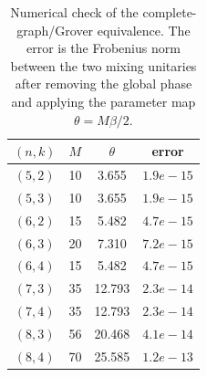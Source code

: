 \begin{table}[t]
\centering
\caption{Numerical check of the complete-graph/Grover equivalence. The error is the Frobenius norm between the two mixing unitaries after removing the global phase and applying the parameter map $\theta=M\beta/2$.}
\label{tab:grover-equivalence}
\begin{tabular}{cccc}
\toprule
$(n,k)$ & $M$ & $\theta$ & error\\
\midrule
$(5,2)$ & 10 & 3.655 & $1.9e-15$\\
$(5,3)$ & 10 & 3.655 & $1.9e-15$\\
$(6,2)$ & 15 & 5.482 & $4.7e-15$\\
$(6,3)$ & 20 & 7.310 & $7.2e-15$\\
$(6,4)$ & 15 & 5.482 & $4.7e-15$\\
$(7,3)$ & 35 & 12.793 & $2.3e-14$\\
$(7,4)$ & 35 & 12.793 & $2.3e-14$\\
$(8,3)$ & 56 & 20.468 & $4.1e-14$\\
$(8,4)$ & 70 & 25.585 & $1.2e-13$\\
\bottomrule
\end{tabular}
\end{table}
